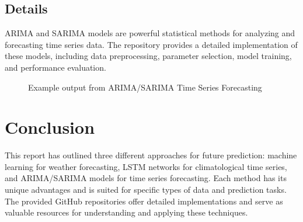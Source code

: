 \documentclass{article}
\begin{document}
\subsection{Details}
ARIMA and SARIMA models are powerful statistical methods for analyzing and forecasting time series data. The repository provides a detailed implementation of these models, including data preprocessing, parameter selection, model training, and performance evaluation.

\begin{figure}[h]
\centering
\caption{Example output from ARIMA/SARIMA Time Series Forecasting}
\end{figure}

\section{Conclusion}
This report has outlined three different approaches for future prediction: machine learning for weather forecasting, LSTM networks for climatological time series, and ARIMA/SARIMA models for time series forecasting. Each method has its unique advantages and is suited for specific types of data and prediction tasks. The provided GitHub repositories offer detailed implementations and serve as valuable resources for understanding and applying these techniques.
\end{document}
